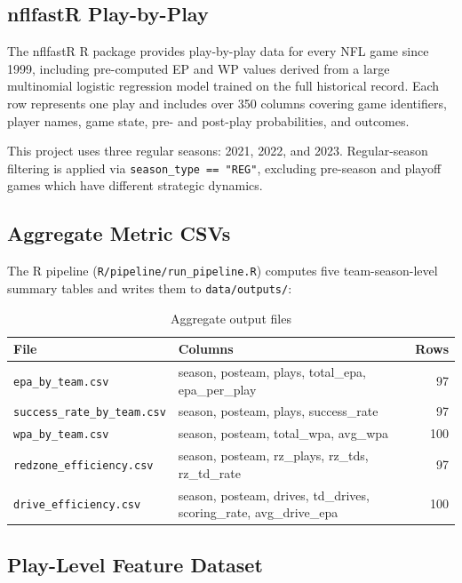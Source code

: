 \documentclass[11pt]{article}
\begin{document}
\subsection{nflfastR Play-by-Play}

The nflfastR R package provides play-by-play data for every NFL game since 1999,
including pre-computed EP and WP values derived from a large multinomial logistic
regression model trained on the full historical record. Each row represents one
play and includes over 350 columns covering game identifiers, player names, game
state, pre- and post-play probabilities, and outcomes.

This project uses three regular seasons: 2021, 2022, and 2023. Regular-season
filtering is applied via \texttt{season\_type == "REG"}, excluding pre-season and
playoff games which have different strategic dynamics.

\subsection{Aggregate Metric CSVs}

The R pipeline (\texttt{R/pipeline/run\_pipeline.R}) computes five team-season-level
summary tables and writes them to \texttt{data/outputs/}:

\begin{table}[H]
\centering
\caption{Aggregate output files}
\begin{tabular}{llr}
\toprule
File & Columns & Rows \\
\midrule
\texttt{epa\_by\_team.csv} & season, posteam, plays, total\_epa, epa\_per\_play & 97 \\
\texttt{success\_rate\_by\_team.csv} & season, posteam, plays, success\_rate & 97 \\
\texttt{wpa\_by\_team.csv} & season, posteam, total\_wpa, avg\_wpa & 100 \\
\texttt{redzone\_efficiency.csv} & season, posteam, rz\_plays, rz\_tds, rz\_td\_rate & 97 \\
\texttt{drive\_efficiency.csv} & season, posteam, drives, td\_drives, scoring\_rate, avg\_drive\_epa & 100 \\
\bottomrule
\end{tabular}
\end{table}

\subsection{Play-Level Feature Dataset}
\end{document}
